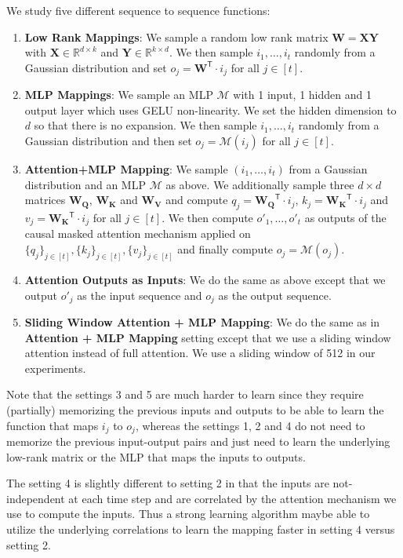 We study five different sequence to sequence functions:
\begin{enumerate}
    \item \textbf{Low Rank Mappings}: We sample a random low rank matrix $\mathbf{W} = \mathbf{X}\mathbf{Y}$ with $\mathbf{X} \in \mathbb{R}^{d \times k}$ and $\mathbf{Y} \in \mathbb{R}^{k \times d}$. We then sample $i_1, \ldots, i_t$ randomly from a Gaussian distribution and set $o_j = \mathbf{W}^{\mathsf{T}} \cdot i_j$ for all $j \in [t]$.
    \item \textbf{MLP Mappings}: We sample an MLP $\mathcal{M}$ with 1 input, 1 hidden and 1 output layer which uses GELU non-linearity. We set the hidden dimension to $d$ so that there is no expansion. We then sample $i_1, \ldots, i_t$ randomly from a Gaussian distribution and then set $o_j = \mathcal{M}(i_j)$ for all $j \in [t]$.
    \item \textbf{Attention+MLP Mapping}: We sample $(i_1, \ldots, i_t)$ from a Gaussian distribution and an MLP $\mathcal{M}$ as above. We additionally sample three $d \times d$ matrices $\mathbf{W_Q}$, $\mathbf{W_K}$ and $\mathbf{W_V}$ and compute $q_j = \mathbf{W_Q}^{\mathsf{T}} \cdot i_j$, $k_j = \mathbf{W_K}^{\mathsf{T}} \cdot i_j$ and $v_j = \mathbf{W_K}^{\mathsf{T}} \cdot i_j$ for all $j \in [t]$. We then compute $o'_1, \ldots, o'_t$ as outputs of the causal masked attention mechanism applied on $\{q_j\}_{j \in [t]}, \{k_j\}_{j \in [t]}, \{v_j\}_{j \in [t]}$ and finally compute $o_j = \mathcal{M}(o_j)$.
    \item \textbf{Attention Outputs as Inputs}: We do the same as above except that we output $o'_j$ as the input sequence and $o_j$ as the output sequence.
    \item \textbf{Sliding Window Attention + MLP Mapping}: We do the same as in \textbf{Attention + MLP Mapping} setting except that we use a sliding window attention instead of full attention. We use a sliding window of 512 in our experiments.
\end{enumerate}
Note that the settings 3 and 5 are much harder to learn since they require (partially) memorizing the previous inputs and outputs to be able to learn the function that maps $i_j$ to $o_j$, whereas the settings 1, 2 and 4 do not need to memorize the previous input-output pairs and just need to learn the underlying low-rank matrix or the MLP that maps the inputs to outputs.

The setting 4 is slightly different to setting 2 in that the inputs are not-independent at each time step and are correlated by the attention mechanism we use to compute the inputs. Thus a strong learning algorithm maybe able to utilize the underlying correlations to learn the mapping faster in setting 4 versus setting 2. 






